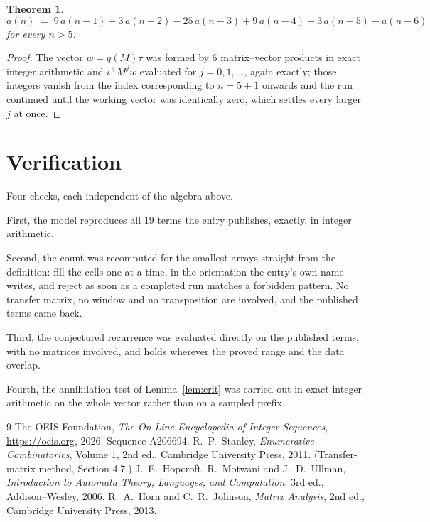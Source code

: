 \documentclass[11pt,a4paper]{article}
\theoremstyle{plain}
\newtheorem{theorem}{Theorem}
\theoremstyle{definition}
\begin{document}
\begin{theorem}
\[
a(n)\;=\;9\,a(n-1) - 3\,a(n-2) - 25\,a(n-3) + 9\,a(n-4) + 3\,a(n-5) - a(n-6)
\]
for every $n>5$.
\end{theorem}

\begin{proof}
The vector $w=q(M)\tau$ was formed by $6$ matrix--vector products in exact integer
arithmetic and $\iota^{\!\top}M^{j}w$ evaluated for $j=0,1,\dots$, again exactly; those
integers vanish from the index corresponding to $n=5+1$ onwards and the run continued
until the working vector was identically zero, which settles every larger $j$ at once.
\end{proof}

\section{Verification}

Four checks, each independent of the algebra above.

First, the model reproduces all $19$ terms the entry publishes, exactly, in integer
arithmetic.

Second, the count was recomputed for the smallest arrays straight from the definition: fill the
cells one at a time, in the orientation the entry's own name writes, and reject as soon as a
completed run matches a forbidden pattern. No transfer matrix, no window and no transposition
are involved, and the published terms came back.

Third, the conjectured recurrence was evaluated directly on the published terms, with no
matrices involved, and holds wherever the proved range and the data overlap.

Fourth, the annihilation test of Lemma~\ref{lem:crit} was carried out in exact integer
arithmetic on the whole vector rather than on a sampled prefix.

\begin{thebibliography}{9}
 The OEIS Foundation, \emph{The On-Line Encyclopedia of Integer
Sequences}, \url{https://oeis.org}, 2026. Sequence A206694.
 R.~P.~Stanley, \emph{Enumerative Combinatorics}, Volume 1, 2nd ed.,
Cambridge University Press, 2011. (Transfer-matrix method, Section 4.7.)
 J.~E.~Hopcroft, R.~Motwani and J.~D.~Ullman, \emph{Introduction to Automata
Theory, Languages, and Computation}, 3rd ed., Addison--Wesley, 2006.
 R.~A.~Horn and C.~R.~Johnson, \emph{Matrix Analysis}, 2nd ed., Cambridge
University Press, 2013.
\end{thebibliography}
\end{document}
